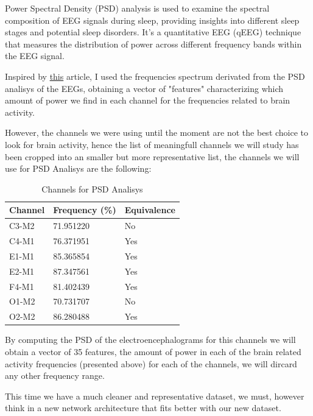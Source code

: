 Power Spectral Density (PSD) analysis is used to examine the spectral composition of EEG signals during sleep, providing insights into different sleep stages and potential sleep disorders. It's a quantitative EEG (qEEG) technique that measures the distribution of power across different frequency bands within the EEG signal.

Inspired by \href{https://mne.tools/stable/auto_tutorials/clinical/60_sleep.html#design-a-scikit-learn-transformer-from-a-python-function}{this} article, I used the frequencies spectrum derivated from the PSD analisys of the EEGs, obtaining a vector of "features" characterizing which amount of power we find in each channel for the frequencies related to brain activity.

However, the channels we were using until the moment are not the best choice to look for brain activity, hence the list of meaningfull channels we will study has been cropped into an smaller but more representative list, the channels we will use for PSD Analisys are the following:

\begin{table}[H]
\begin{center}
\begin{tabular}{ |p{3cm}||p{3cm}||p{3cm}| }
 \hline
 Channel & Frequency (\%) & Equivalence\\
 \hline  
 C3-M2 & 71.951220 & No \\
 C4-M1 & 76.371951 & Yes \\
 E1-M1 & 85.365854 & Yes \\
 E2-M1 & 87.347561 & Yes \\
 F4-M1 & 81.402439 & Yes \\
 O1-M2 & 70.731707 & No \\
 O2-M2 & 86.280488 & Yes \\
 \hline
\end{tabular}
\end{center}
\caption{Channels for PSD Analisys}
\label{tab3}
\end{table}

By computing the PSD of the electroencephalograms for this channels we will obtain a vector of 35 features, the amount of power in each of the brain related activity frequencies (presented above) for each of the channels, we will dircard any other frequency range.

This time we have a much cleaner and representative dataset, we must, however think in a new network architecture that fits better with our new dataset.


